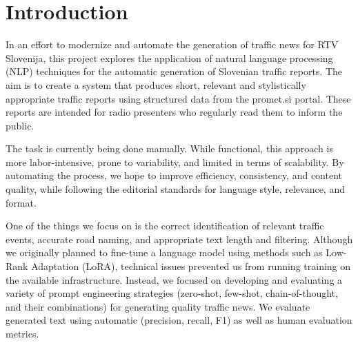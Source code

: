 \documentclass[fleqn,moreauthors,10pt]{ds_report}
\affiliation{\textit{Advisors: Slavko Žitnik}}
\begin{document}
\flushbottom 

\maketitle 

\thispagestyle{empty} 


\section*{Introduction}
In an effort to modernize and automate the generation of traffic news for RTV Slovenija, this project explores the application of natural language processing (NLP) techniques for the automatic generation of Slovenian traffic reports. The aim is to create a system that produces short, relevant and stylistically appropriate traffic reports using structured data from the promet.si portal. These reports are intended for radio presenters who regularly read them to inform the public.\newline

The task is currently being done manually. While functional, this approach is more labor-intensive, prone to variability, and limited in terms of scalability. By automating the process, we hope to improve efficiency, consistency, and content quality, while following the editorial standards for language style, relevance, and format.\newline

One of the things we focus on is the correct identification of relevant traffic events, accurate road naming, and appropriate text length and filtering. Although we originally planned to fine-tune a language model using methods such as Low-Rank Adaptation (LoRA), technical issues prevented us from running training on the available infrastructure. Instead, we focused on developing and evaluating a variety of prompt engineering strategies (zero-shot, few-shot, chain-of-thought, and their combinations) for generating quality traffic news. We evaluate generated text using automatic (precision, recall, F1) as well as human evaluation metrics.\newline
\end{document}
